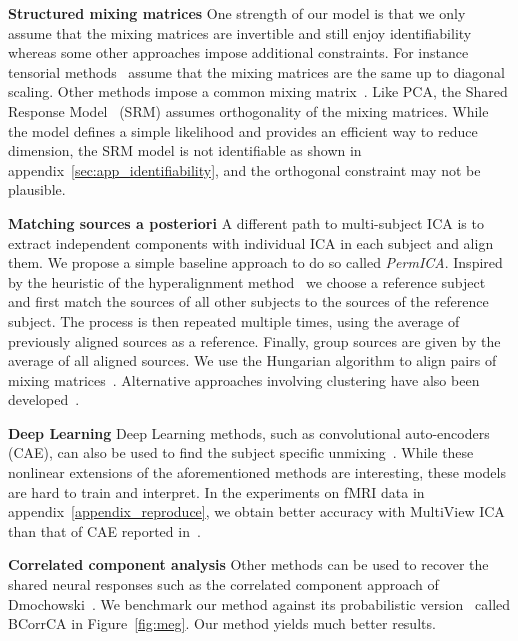 \textbf{Structured mixing matrices} One strength of our model is that we only assume that the mixing matrices are invertible and still enjoy identifiability whereas some other approaches impose additional constraints. For instance tensorial methods~\cite{beckmann2005tensorial} assume that the mixing matrices are the same up to diagonal scaling.
%
Other methods impose a common mixing matrix~\cite{cong2013validating, grin2010independent, calhoun2001fmri, Monti18UAI}. Like PCA, the Shared Response Model~\cite{chen2015reduced} (SRM) assumes orthogonality of the mixing matrices. While the model defines a simple likelihood and provides an efficient way to reduce dimension, the SRM model is not identifiable as shown in appendix~\ref{sec:app_identifiability}, and the orthogonal constraint may not be plausible.
%

\textbf{Matching sources a posteriori} A different path to multi-subject ICA is to extract independent components with individual ICA in each subject and align them. We propose a simple baseline approach to do so called \emph{PermICA}.
Inspired by the heuristic of the hyperalignment method~\cite{haxby2011common} we choose a reference subject and first match the sources of all other subjects to the sources of the reference subject. The process is then repeated multiple times, using the average of previously aligned sources as a reference. Finally, group sources are given by the average of all aligned sources. We use the Hungarian algorithm to align pairs of mixing matrices~\cite{tichavsky2004optimal}.
%
Alternative approaches involving clustering have also been developed~\cite{esposito2005independent,bigdely2013measure}.

\textbf{Deep Learning} Deep Learning methods, such as convolutional auto-encoders (CAE), can also be used to find the subject specific unmixing~\cite{chen2016convolutional}. While these nonlinear extensions of the aforementioned methods are interesting, these models are hard to train and interpret. In the experiments on fMRI data in appendix~\ref{appendix_reproduce}, we obtain better accuracy with MultiView ICA than that of CAE reported in~\cite{chen2016convolutional}.

\textbf{Correlated component analysis} Other methods can be used to recover the shared neural responses such as the correlated component approach of Dmochowski~\cite{dmochowski2012correlated}. We benchmark our method against its probabilistic version~\cite{kamronn2015multiview} called BCorrCA in Figure~\ref{fig:meg}. Our method yields much better results. 

